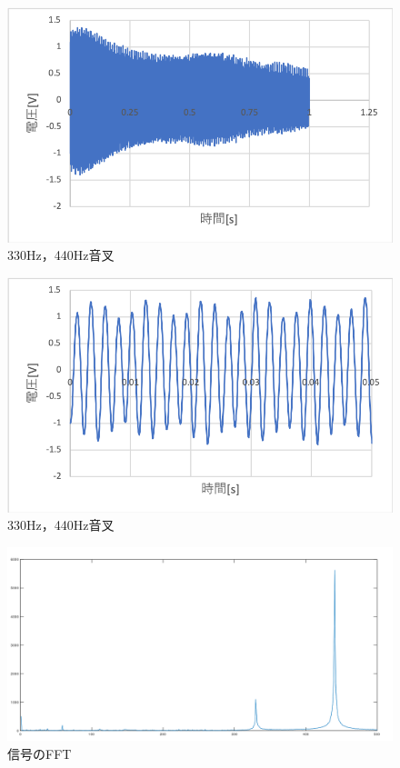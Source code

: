 \documentclass[11pt, a4paper,twocolumn]{jarticle}
\begin{document}
\begin{figure}[htbp]
 \begin{center}
  \includegraphics[width=0.8\linewidth]{mix.png}
 \end{center}
 \caption{330Hz，440Hz音叉}
 \label{fig:mix}
\end{figure}

\begin{figure}[htbp]
 \begin{center}
  \includegraphics[width=0.8\linewidth]{fig28.png}
 \end{center}
 \caption{330Hz，440Hz音叉}
 \label{fig:28}
\end{figure}

\begin{figure}[htbp]
 \begin{center}
  \includegraphics[width=0.8\linewidth]{fftmix.png}
 \end{center}
 \caption{信号のFFT}
 \label{fig:fftmix}
\end{figure}
\end{document}
